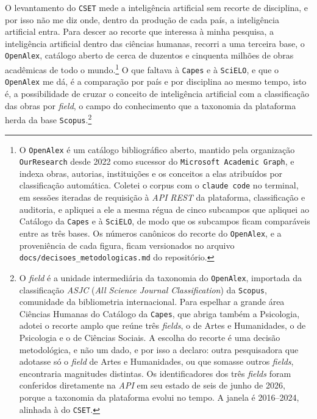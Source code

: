 O levantamento do \texttt{CSET} mede a inteligência artificial sem recorte de disciplina, e por isso não me diz onde, dentro da produção de cada país, a inteligência artificial entra. Para descer ao recorte que interessa à minha pesquisa, a inteligência artificial dentro das ciências humanas, recorri a uma terceira base, o \texttt{OpenAlex}, catálogo aberto de cerca de duzentos e cinquenta milhões de obras acadêmicas de todo o mundo.\footnote{O \texttt{OpenAlex} é um catálogo bibliográfico aberto, mantido pela organização \texttt{OurResearch} desde 2022 como sucessor do \texttt{Microsoft Academic Graph}, e indexa obras, autorias, instituições e os conceitos a elas atribuídos por classificação automática. Coletei o corpus com o \texttt{claude code} no terminal, em sessões iteradas de requisição à \emph{API} \emph{REST} da plataforma, classificação e auditoria, e apliquei a ele a mesma régua de cinco subcampos que apliquei ao Catálogo da \texttt{Capes} e à \texttt{SciELO}, de modo que os subcampos ficam comparáveis entre as três bases. Os números canônicos do recorte do \texttt{OpenAlex}, e a proveniência de cada figura, ficam versionados no arquivo \texttt{docs/decisoes\_metodologicas.md} do repositório.} O que faltava à \texttt{Capes} e à \texttt{SciELO}, e que o \texttt{OpenAlex} me dá, é a comparação por país e por disciplina ao mesmo tempo, isto é, a possibilidade de cruzar o conceito de inteligência artificial com a classificação das obras por \emph{field}, o campo do conhecimento que a taxonomia da plataforma herda da base \texttt{Scopus}.\footnote{O \emph{field} é a unidade intermediária da taxonomia do \texttt{OpenAlex}, importada da classificação \emph{ASJC} (\emph{All Science Journal Classification}) da \texttt{Scopus}, comunidade da bibliometria internacional. Para espelhar a grande área Ciências Humanas do Catálogo da \texttt{Capes}, que abriga também a Psicologia, adotei o recorte amplo que reúne três \emph{fields}, o de Artes e Humanidades, o de Psicologia e o de Ciências Sociais. A escolha do recorte é uma decisão metodológica, e não um dado, e por isso a declaro: outra pesquisadora que adotasse só o \emph{field} de Artes e Humanidades, ou que somasse outros \emph{fields}, encontraria magnitudes distintas. Os identificadores dos três \emph{fields} foram conferidos diretamente na \emph{API} em seu estado de seis de junho de 2026, porque a taxonomia da plataforma evolui no tempo. A janela é 2016--2024, alinhada à do \texttt{CSET}.}

